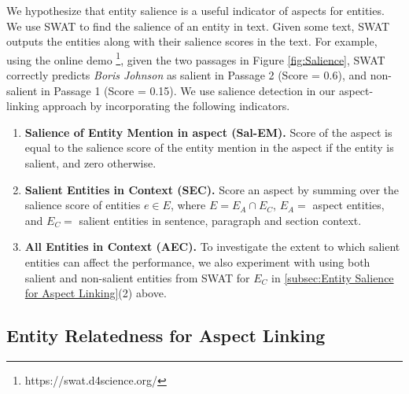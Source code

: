 
We hypothesize that entity salience is a useful indicator of aspects for entities. We use SWAT \cite{swat}  to find the salience of an entity in text. Given some text, SWAT outputs the entities along with their salience scores in the text. For example, using the online demo \footnote{https://swat.d4science.org/}, given the two passages in Figure \ref{fig:Salience}, SWAT correctly predicts \textit{Boris Johnson} as salient in Passage 2 (Score = 0.6), and non-salient in Passage 1 (Score = 0.15). 
We use salience detection in our aspect-linking approach by incorporating the following indicators.


\begin{enumerate}
    \item \textbf{Salience of Entity Mention in aspect (Sal-EM).} Score of the aspect is equal to the salience score of the entity mention in the aspect if the entity is salient, and zero otherwise.
    
    \item \textbf{Salient Entities in Context (SEC).} Score an aspect by summing over the salience score of entities $e \in E$, where $E = E_A \cap E_C$, $E_A =$ aspect entities, and $E_C =$ salient entities in sentence, paragraph and section context.
    
    \item \textbf{All Entities in Context (AEC).} 
    To investigate the extent to which salient entities can affect the performance, we also experiment with using both salient and non-salient entities from SWAT for $E_C$ in \ref{subsec:Entity Salience for Aspect Linking}(2) above. 
\end{enumerate}


\subsection{Entity Relatedness for Aspect Linking}
\label{subsec:Entity Relatedness for Aspect Linking}



